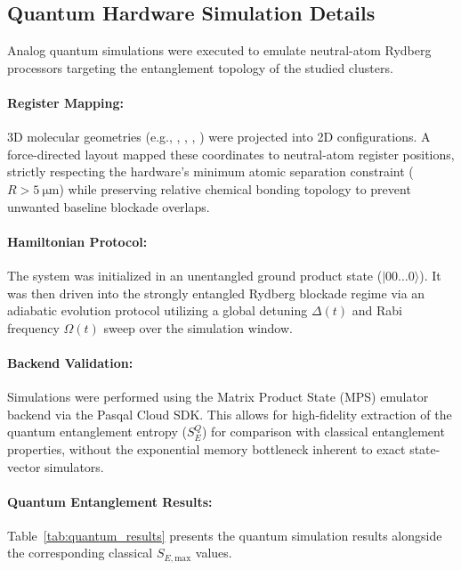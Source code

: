 \documentclass[12pt,a4paper]{article}
\begin{document}
\subsection{Quantum Hardware Simulation Details}
\label{sec:quantum_si}

Analog quantum simulations were executed to emulate neutral-atom
Rydberg processors targeting the entanglement topology of the studied
clusters.

\paragraph{Register Mapping:}
3D molecular geometries (e.g., , , ,
) were projected into 2D configurations. A force-directed
layout mapped these coordinates to neutral-atom register positions,
strictly respecting the hardware's minimum atomic separation constraint
($R > \SI{5}{\micro\meter}$) while preserving relative chemical bonding
topology to prevent unwanted baseline blockade overlaps.

\paragraph{Hamiltonian Protocol:}
The system was initialized in an unentangled ground product state
($|00\ldots0\rangle$). It was then driven into the strongly entangled
Rydberg blockade regime via an adiabatic evolution protocol utilizing a
global detuning $\Delta(t)$ and Rabi frequency $\Omega(t)$ sweep
over the simulation window.

\paragraph{Backend Validation:}
Simulations were performed using the Matrix Product State (MPS) emulator
backend via the Pasqal Cloud SDK. This allows for high-fidelity
extraction of the quantum entanglement entropy ($S_E^{Q}$) for comparison
with classical entanglement properties, without the exponential memory
bottleneck inherent to exact state-vector simulators.

\paragraph{Quantum Entanglement Results:}
Table~\ref{tab:quantum_results} presents the quantum simulation results
alongside the corresponding classical $S_{E,\text{max}}$ values.
\end{document}

